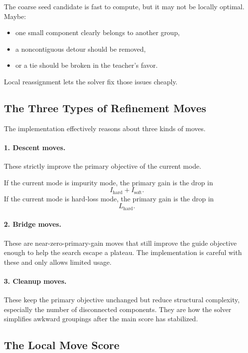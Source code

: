 \documentclass[11pt]{article}
\begin{document}
The coarse seed candidate is fast to compute, but it may not be locally optimal. Maybe:

\begin{itemize}
\item one small component clearly belongs to another group,
\item a noncontiguous detour should be removed,
\item or a tie should be broken in the teacher's favor.
\end{itemize}

Local reassignment lets the solver fix those issues cheaply.

\subsection{The Three Types of Refinement Moves}

The implementation effectively reasons about three kinds of moves.

\paragraph{1. Descent moves.}
These strictly improve the primary objective of the current mode.

If the current mode is impurity mode, the primary gain is the drop in
\[
I_{\mathrm{hard}} + I_{\mathrm{soft}}.
\]
If the current mode is hard-loss mode, the primary gain is the drop in
\[
L_{\mathrm{hard}}.
\]

\paragraph{2. Bridge moves.}
These are near-zero-primary-gain moves that still improve the guide objective enough to help the search escape a plateau. The implementation is careful with these and only allows limited usage.

\paragraph{3. Cleanup moves.}
These keep the primary objective unchanged but reduce structural complexity, especially the number of disconnected components. They are how the solver simplifies awkward groupings after the main score has stabilized.

\subsection{The Local Move Score}
\end{document}
